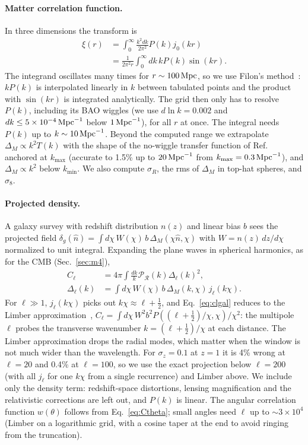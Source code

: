 \paragraph*{Matter correlation function.} In three dimensions the transform is
\begin{align}
\xi(r)&=\int_0^\infty\frac{k^2dk}{2\pi^2}P(k)j_0(kr)\nonumber\\
&=\frac{1}{2\pi^2r}\int_0^\infty dk\,kP(k)\sin(kr).
\end{align}
The integrand oscillates many times for $r\sim100\,\mathrm{Mpc}$, so we use Filon's method~\cite{Filon1929}: $kP(k)$ is
interpolated linearly in $k$ between tabulated points and the product with $\sin(kr)$ is integrated analytically. The
grid then only has to resolve $P(k)$, including its BAO wiggles (we use $d\ln k=0.002$ and $dk\le5\times10^{-4}\,\mathrm{Mpc}^{-1}$
below $1\,\mathrm{Mpc}^{-1}$), for all $r$ at once. The integral needs $P(k)$ up to $k\sim10\,\mathrm{Mpc}^{-1}$. Beyond the computed range
we extrapolate $\Delta_M\propto k^2T(k)$ with the shape of the no-wiggle transfer function of
Ref.~\cite{EisensteinHu1998} anchored at $k_{\max}$ (accurate to 1.5\% up to $20\,\mathrm{Mpc}^{-1}$ from $k_{\max}=0.3\,\mathrm{Mpc}^{-1}$),
and $\Delta_M\propto k^2$ below $k_{\min}$. We also compute $\sigma_R$, the rms of $\Delta_M$ in top-hat spheres, and
$\sigma_8$.

\paragraph*{Projected density.} A galaxy survey with redshift distribution $n(z)$ and linear bias $b$ sees the
projected field $\delta_g(\hat n)=\int d\chi\,W(\chi)\,b\,\Delta_M(\chi\hat n,\chi)$ with $W=n(z)\,dz/d\chi$ normalized to
unit integral. Expanding the plane waves in spherical harmonics, as for the CMB (Sec.~\ref{sec:m4}),
\begin{align}
C_\ell&=4\pi\int\frac{dk}{k}\mathcal P_{\mathcal R}(k)\Delta_\ell(k)^2,\nonumber\\
\Delta_\ell(k)&=\int d\chi\,W(\chi)\,b\,\Delta_M(k,\chi)\,j_\ell(k\chi).
\label{eq:clgal}
\end{align}
For $\ell\gg1$, $j_\ell(k\chi)$ picks out $k\chi\approx\ell+\frac12$, and Eq.~\eqref{eq:clgal} reduces to the Limber
approximation~\cite{Limber1953,LoVerde2008},
$C_\ell=\int d\chi\,W^2b^2P((\ell+\frac12)/\chi,\chi)/\chi^2$: the multipole $\ell$ probes the transverse wavenumber
$k=(\ell+\frac12)/\chi$ at each distance. The Limber approximation drops the radial modes, which matter when the window is
not much wider than the wavelength. For $\sigma_z=0.1$ at $z=1$ it is 4\% wrong at $\ell=20$ and 0.4\% at $\ell=100$, so we
use the exact projection below $\ell=200$ (with all $j_\ell$ for one $k\chi$ from a single recurrence) and Limber
above. We include only the density term: redshift-space distortions, lensing magnification and the relativistic
corrections are left out, and $P(k)$ is linear. The angular correlation function $w(\theta)$ follows from
Eq.~\eqref{eq:Ctheta}; small angles need $\ell$ up to $\sim3\times10^4$ (Limber on a logarithmic grid, with a cosine
taper at the end to avoid ringing from the truncation).

